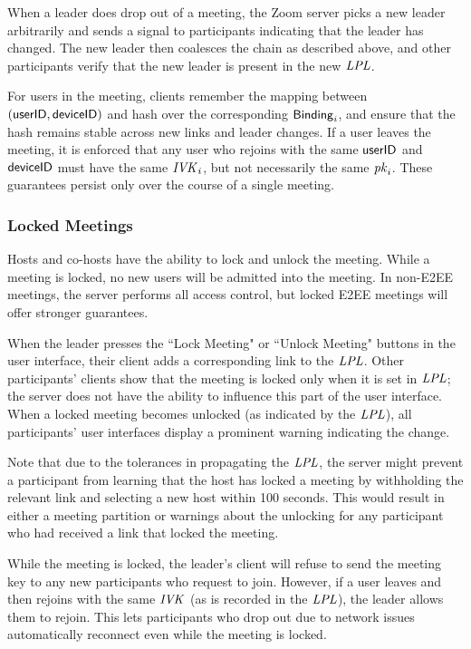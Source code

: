 When a leader does drop out of a meeting, the Zoom server picks a new leader arbitrarily and sends a signal to participants indicating that the leader has changed. The new leader then coalesces the chain as described above, and other participants verify that the new leader is present in the new $\mathit{LPL}$.

For users in the meeting, clients remember the mapping between $(\mathsf{userID}, {\sf deviceID})$ and hash over the corresponding ${\sf Binding}_i$, and ensure that the hash remains stable across new links and leader changes. If a user leaves the meeting, it is enforced that any user who rejoins with the same $\mathsf{userID}$ and ${\sf deviceID}$ must have the same $\mathit{IVK}_i$, but not necessarily the same $\mathit{pk}_i$. These guarantees persist only over the course of a single meeting.

\subsubsection{Locked Meetings}
\label{subsubsec:lockedmeetings}
Hosts and co-hosts have the ability to lock and unlock the meeting. While a meeting is locked, no new users will be admitted into the meeting. In non-E2EE meetings, the server performs all access control, but locked E2EE meetings will offer stronger guarantees.

When the leader presses the ``Lock Meeting" or ``Unlock Meeting" buttons in the user interface, their client adds a corresponding link to the $\mathit{LPL}$. Other participants' clients show that the meeting is locked only when it is set in $\mathit{LPL}$; the server does not have the ability to influence this part of the user interface. When a locked meeting becomes unlocked (as indicated by the $\mathit{LPL}$), all participants' user interfaces display a prominent warning indicating the change. 

Note that due to the tolerances in propagating the $\mathit{LPL}$, the server might prevent a participant from learning that the host has locked a meeting by withholding the relevant link and selecting a new host within 100 seconds. This would result in either a meeting partition or warnings about the unlocking for any participant who had received a link that locked the meeting.

While the meeting is locked, the leader's client will refuse to send the meeting key to any new participants who request to join. However, if a user leaves and then rejoins with the same $\mathit{IVK}$ (as is recorded in the $\mathit{LPL}$), the leader allows them to rejoin. This lets participants who drop out due to network issues automatically reconnect even while the meeting is locked. 

